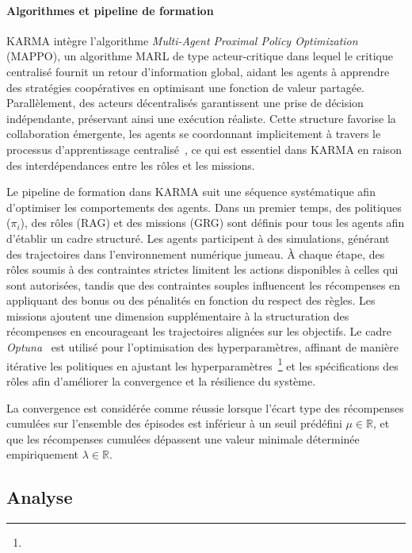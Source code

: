 \paragraph*{Algorithmes et pipeline de formation}

KARMA intègre l'algorithme \textit{Multi-Agent Proximal Policy Optimization}~\cite{Yu2022} (MAPPO), un algorithme MARL de type acteur-critique dans lequel le critique centralisé fournit un retour d'information global, aidant les agents à apprendre des stratégies coopératives en optimisant une fonction de valeur partagée. Parallèlement, des acteurs décentralisés garantissent une prise de décision indépendante, préservant ainsi une exécution réaliste. Cette structure favorise la collaboration émergente, les agents se coordonnant implicitement à travers le processus d'apprentissage centralisé~\cite{Yu2022}, ce qui est essentiel dans KARMA en raison des interdépendances entre les rôles et les missions.

Le pipeline de formation dans KARMA suit une séquence systématique afin d'optimiser les comportements des agents. Dans un premier temps, des politiques (\(\pi_i\)), des rôles (RAG) et des missions (GRG) sont définis pour tous les agents afin d'établir un cadre structuré. Les agents participent à des simulations, générant des trajectoires dans l'environnement numérique jumeau. À chaque étape, des rôles soumis à des contraintes strictes limitent les actions disponibles à celles qui sont autorisées, tandis que des contraintes souples influencent les récompenses en appliquant des bonus ou des pénalités en fonction du respect des règles. Les missions ajoutent une dimension supplémentaire à la structuration des récompenses en encourageant les trajectoires alignées sur les objectifs. Le cadre \textit{Optuna}~\cite{akiba2019optuna} est utilisé pour l'optimisation des hyperparamètres, affinant de manière itérative les politiques en ajustant les hyperparamètres~\footnote{} et les spécifications des rôles afin d'améliorer la convergence et la résilience du système.

La convergence est considérée comme réussie lorsque l'écart type des récompenses cumulées sur l'ensemble des épisodes est inférieur à un seuil prédéfini $\mu \in \mathbb{R}$, et que les récompenses cumulées dépassent une valeur minimale déterminée empiriquement $\lambda \in \mathbb{R}$.


\subsection{Analyse}
\label{sec:analyse}

